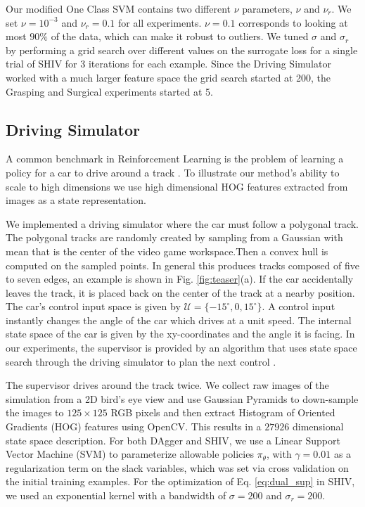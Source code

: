 \documentclass[10pt, conference]{ieeeconf}      %
\newcommand{\acro}{SHIV}
\begin{document}
Our modified One Class SVM contains two different $\nu$ parameters, $\nu$ and $\nu_r$. We set $\nu = 10^{-3}$ and $\nu_r = 0.1$ for all experiments.  $\nu = 0.1$ corresponds to looking at most $90\%$ of the data, which can make it robust to outliers. We tuned $\sigma$ and $\sigma_r$ by performing a grid search over different values on the surrogate loss for a single trial of SHIV for 3 iterations for each example. Since the Driving Simulator worked with a much larger feature space the grid search started at 200, the Grasping and Surgical experiments started at 5. 

\subsection{Driving Simulator} \label{sec:car}
A common benchmark in Reinforcement Learning is the problem of learning a policy for a car to drive around a track
\cite{argall2009survey}. To illustrate our method's ability to scale to high dimensions we use high dimensional HOG features extracted from images
as a state representation. 

We implemented a driving simulator where the car must follow a polygonal track. The polygonal tracks are randomly created by sampling from a Gaussian with mean that is the center of the video game workspace.Then a convex hull is computed on the sampled points. In general this produces tracks composed of five to seven edges, an example is shown in Fig. \ref{fig:teaser}(a). If the car accidentally leaves the track, it is placed
back on the center of the track at a nearby position. The car's control input space is given by  $\mathcal{U} = \lbrace
-15^\circ, 0, 15^\circ \rbrace$. A control input instantly changes the angle of the car which drives at a unit speed. 
The internal state space of the car is given by the
xy-coordinates and the angle it is facing. In our experiments, the supervisor is provided by an algorithm that uses
state space search through the driving simulator to plan the next control .

The supervisor drives around the track twice. We collect raw images of the simulation from a 2D bird's eye view
and use Gaussian Pyramids to down-sample the images to $125 \times 125$ RGB pixels and then extract Histogram of
Oriented Gradients (HOG) features using OpenCV. This results in a $27926$ dimensional state space description.
For both DAgger and \acro, we use a Linear Support Vector Machine (SVM) to parameterize allowable
policies $\pi_{\theta}$, with $\gamma=0.01$ as a regularization term on the slack variables, which was set via cross
validation on the initial training examples. For the optimization of Eq. \ref{eq:dual_sup} in \acro, we used an
exponential kernel with a bandwidth of $\sigma = 200$ and $\sigma_r = 200$.
\end{document}
